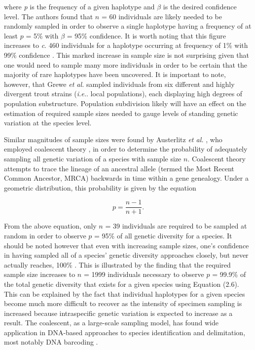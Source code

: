 \noindent where \textit{p} is the frequency of a given haplotype and $\beta$ is the desired confidence level. The authors found that $n$ = 60 individuals are likely needed to be randomly sampled in order to observe a single haplotype having a frequency of at least $p$ = 5\% with $\beta$ = 95\% confidence. It is worth noting that this figure increases to \textit{c}. 460 individuals for a haplotype occurring at frequency of 1\% with 99\% confidence \cite{grewe1993mitochondrial}. This marked increase in sample size is not surprising given that one would need to sample many more individuals in order to be certain that the majority of rare haplotypes have been uncovered. It is important to note, however, that Grewe \textit{et al.} \cite{grewe1993mitochondrial} sampled individuals from six different and highly divergent trout strains (\textit{i.e.}. local populations), each displaying high degrees of population substructure. Population subdivision likely will have an effect on the estimation of required sample sizes needed to gauge levels of standing genetic variation at the species level. 



Similar magnitudes of sample sizes were found by Austerlitz \textit{et al.} \cite{austerlitz2009dna}, who employed coalescent theory \cite{kingman1982coalescent}, in order to determine the probability of adequately sampling all genetic variation of a species with sample size $n$. Coalescent theory attempts to trace the lineage of an ancestral allele (termed the Most Recent Common Ancestor, MRCA) backwards in time within a gene genealogy. Under a geometric distribution, this probability is given by the equation \cite{austerlitz2009dna}

\begin{equation}
p = \frac{n - 1}{n + 1}.
\end{equation}



\noindent From the above equation, only $n$ = 39 individuals are required to be sampled at random in order to observe $p$ = 95\% of all genetic diversity for a species. It should be noted however that even with increasing sample sizes, one's confidence in having sampled all of a species’ genetic diversity approaches closely, but never actually reaches, 100\% \cite{austerlitz2009dna}. This is illustrated by the finding that the required sample size increases to $n$ = 1999 individuals necessary to observe $p$ = 99.9\% of the total genetic diversity that exists for a given species using Equation (2.6). This can be explained by the fact that individual haplotypes for a given species become much more difficult to recover as the intensity of specimen sampling is increased because intraspecific genetic variation is expected to increase as a result. The coalescent, as a large-scale sampling model, has found wide application in DNA-based approaches to species identification and delimitation, most notably DNA barcoding \cite{hubert2015dna}.



